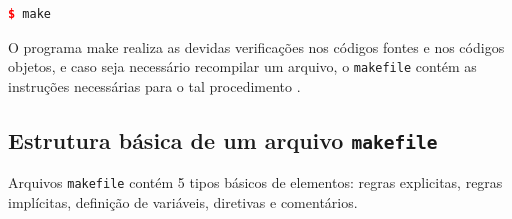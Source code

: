 \begin{lstlisting}[language=C++,caption={
                             Chamada de sistema para executar o programa make},
				                                                label=codigo_20]
    $ make
\end{lstlisting}


O programa make realiza as devidas verificações nos códigos fontes e
 nos códigos objetos, e caso seja necessário recompilar um arquivo, o
 \texttt{makefile} contém as instruções necessárias para o tal procedimento
 \cite[pág. 1]{ref45}.


\subsection{Estrutura básica de um arquivo \texttt{makefile}}

Arquivos \texttt{makefile} contém 5 tipos básicos de elementos: regras explicitas,
 regras implícitas, definição de variáveis, diretivas e comentários.

